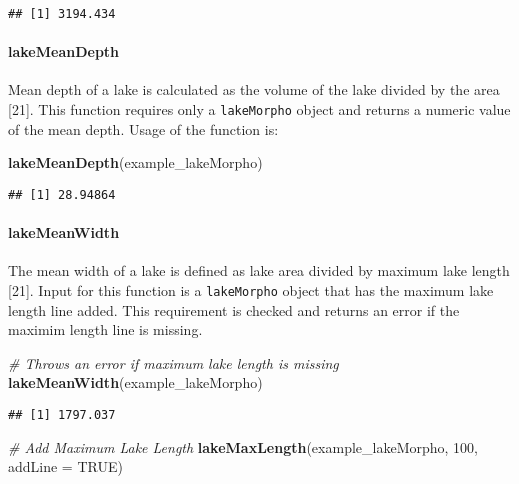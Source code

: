 \documentclass[11pt,]{article}
\newenvironment{Shaded}{\begin{snugshade}}{\end{snugshade}}
\newcommand{\KeywordTok}[1]{\textcolor[rgb]{0.13,0.29,0.53}{\textbf{{#1}}}}
\newcommand{\DataTypeTok}[1]{\textcolor[rgb]{0.13,0.29,0.53}{{#1}}}
\newcommand{\DecValTok}[1]{\textcolor[rgb]{0.00,0.00,0.81}{{#1}}}
\newcommand{\CommentTok}[1]{\textcolor[rgb]{0.56,0.35,0.01}{\textit{{#1}}}}
\newcommand{\OtherTok}[1]{\textcolor[rgb]{0.56,0.35,0.01}{{#1}}}
\newcommand{\NormalTok}[1]{{#1}}
\begin{document}
\begin{verbatim}
## [1] 3194.434
\end{verbatim}

\paragraph{lakeMeanDepth}\label{lakemeandepth}

Mean depth of a lake is calculated as the volume of the lake divided by
the area {[}21{]}. This function requires only a \texttt{lakeMorpho}
object and returns a numeric value of the mean depth. Usage of the
function is:

\begin{Shaded}
\begin{Highlighting}[]
\KeywordTok{lakeMeanDepth}\NormalTok{(example_lakeMorpho)}
\end{Highlighting}
\end{Shaded}

\begin{verbatim}
## [1] 28.94864
\end{verbatim}

\paragraph{lakeMeanWidth}\label{lakemeanwidth}

The mean width of a lake is defined as lake area divided by maximum lake
length {[}21{]}. Input for this function is a \texttt{lakeMorpho} object
that has the maximum lake length line added. This requirement is checked
and returns an error if the maximim length line is missing.

\begin{Shaded}
\begin{Highlighting}[]
\CommentTok{# Throws an error if maximum lake length is missing}
\KeywordTok{lakeMeanWidth}\NormalTok{(example_lakeMorpho)}
\end{Highlighting}
\end{Shaded}

\begin{verbatim}
## [1] 1797.037
\end{verbatim}

\begin{Shaded}
\begin{Highlighting}[]
\CommentTok{# Add Maximum Lake Length}
\KeywordTok{lakeMaxLength}\NormalTok{(example_lakeMorpho, }\DecValTok{100}\NormalTok{, }\DataTypeTok{addLine =} \OtherTok{TRUE}\NormalTok{)}
\end{Highlighting}
\end{Shaded}
\end{document}
